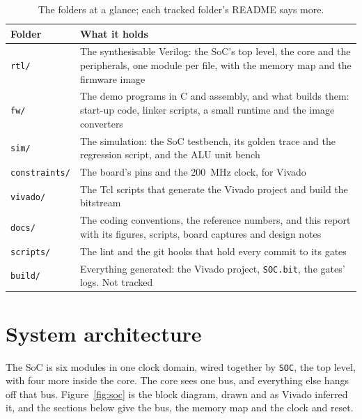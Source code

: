 \documentclass[11pt,a4paper]{report}
\begin{document}
\begin{table}[!ht]
  \centering
  \small
  \begin{tabular}{@{}>{\raggedright\arraybackslash}p{2.5cm}
      >{\raggedright\arraybackslash}p{11.4cm}@{}}
    \toprule
    Folder & What it holds \\
    \midrule
    \texttt{rtl/} & The synthesisable Verilog: the SoC's top level, the core and the
      peripherals, one module per file, with the memory map and the firmware image \\
    \texttt{fw/} & The demo programs in C and assembly, and what builds them: start-up code,
      linker scripts, a small runtime and the image converters \\
    \texttt{sim/} & The simulation: the SoC testbench, its golden trace and the regression
      script, and the ALU unit bench \\
    \texttt{constraints/} & The board's pins and the 200~MHz clock, for Vivado \\
    \texttt{vivado/} & The Tcl scripts that generate the Vivado project and build the
      bitstream \\
    \texttt{docs/} & The coding conventions, the reference numbers, and this report with its
      figures, scripts, board captures and design notes \\
    \texttt{scripts/} & The lint and the git hooks that hold every commit to its gates \\
    \texttt{build/} & Everything generated: the Vivado project, \texttt{SOC.bit}, the gates'
      logs. Not tracked \\
    \bottomrule
  \end{tabular}
  \caption{The folders at a glance; each tracked folder's README says more.}
  \label{tab:folders}
\end{table}

\chapter{System architecture}
\label{ch:arch}

The SoC is six modules in one clock domain, wired together by \texttt{SOC}, the top level,
with four more inside the core. The core sees one bus, and everything else hangs off that
bus. Figure~\ref{fig:soc} is the block diagram, drawn and as Vivado inferred it, and the sections
below give the bus, the memory map and the clock and reset.
\end{document}
